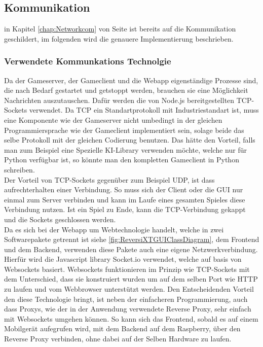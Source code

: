 \documentclass[12pt,a4paper,bibliography=totocnumbered,listof=totocnumbered]{article}
\begin{document}
\subsection{Kommunikation}
in Kapitel \ref{chap:Networkcom} von Seite \pageref{chap:Networkcom} ist bereits auf die Kommunikation geschildert, im folgenden wird die genauere Implementierung beschrieben.

\subsubsection{Verwendete Kommunkations Technolgie}
Da der Gameserver, der Gameclient und die Webapp eigenständige Prozesse sind, die nach Bedarf gestartet und getstoppt werden, brauchen sie eine 
Möglichkeit Nachrichten auszutauschen. Dafür werden die von Node.js bereitgestellten TCP-Sockets verwendet. 
Da TCP ein Standartprotokoll mit Industriestandart ist, muss eine Komponente wie der Gameserver nicht umbedingt in der gleichen Programmiersprache 
wie der Gameclient implementiert sein, solage beide das selbe Protokoll mit der gleichen Codierung benutzen.
Das hätte den Vorteil, falls man zum Beispiel eine Spezielle KI-Library verwenden möchte, welche nur für Python verfügbar ist, so könnte man 
den kompletten Gameclient in Python schreiben.
\\
Der Vorteil von TCP-Sockets gegenüber zum Beispiel UDP, ist dass aufrechterhalten einer Verbindung. So muss sich der Client oder die GUI nur einmal zum Server verbinden 
und kann im Laufe eines gesamten Spieles diese Verbindung nutzen. Ist ein Spiel zu Ende, kann die TCP-Verbindung gekappt und die 
Sockets geschlossen werden. 
\\
Da es sich bei der Webapp um Webtechnologie handelt, welche in zwei Softwarepakete getrennt ist siehe \ref{fig:ReversiXTGUIClassDiagram}, dem Frontend und dem Backend, verwenden 
diese Pakete auch eine eigene Netzwerkverbindung. Hierfür wird die Javascript library Socket.io verwendet, welche auf basis von Websockets basiert.
Websockets funktionieren im Prinzip wie TCP-Sockets mit dem Unterschied, dass sie konstruiert wurden um auf dem selben Port wie HTTP zu laufen und vom 
Webbrowser unterstützt werden. Den Entscheidenden Vorteil den diese Technologie bringt, ist neben der einfacheren Programmierung, auch dass Proxys, 
wie der in der Anwendung verwendete Reverse Proxy, sehr einfach mit Websockets umgehen können. So kann sich das Frontend, sobald es auf einem 
Mobilgerät aufegrufen wird, mit dem Backend auf dem Raspberry, über den Reverse Proxy verbinden, ohne dabei auf der Selben Hardware zu laufen.
\end{document}

